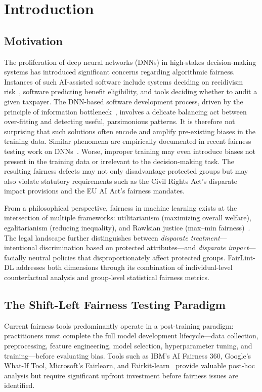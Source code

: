 \chapter{Introduction}
\label{ch:introduction}

\section{Motivation}

The proliferation of deep neural networks (DNNs) in high-stakes decision-making systems has introduced significant concerns regarding algorithmic fairness. Instances of such AI-assisted software include systems deciding on recidivism risk~\cite{dice}, software predicting benefit eligibility, and tools deciding whether to audit a given taxpayer. The DNN-based software development process, driven by the principle of information bottleneck~\cite{dice}, involves a delicate balancing act between over-fitting and detecting useful, parsimonious patterns. It is therefore not surprising that such solutions often encode and amplify pre-existing biases in the training data. Similar phenomena are empirically documented in recent fairness testing work on DNNs~\cite{dice}. Worse, improper training may even introduce biases not present in the training data or irrelevant to the decision-making task. The resulting fairness defects may not only disadvantage protected groups but may also violate statutory requirements such as the Civil Rights Act's disparate impact provisions and the EU AI Act's fairness mandates.

From a philosophical perspective, fairness in machine learning exists at the intersection of multiple frameworks: utilitarianism (maximizing overall welfare), egalitarianism (reducing inequality), and Rawlsian justice (max--min fairness)~\cite{Rawls1973JohnRA, barocas-hardt-narayanan}. The legal landscape further distinguishes between \emph{disparate treatment}---intentional discrimination based on protected attributes---and \emph{disparate impact}---facially neutral policies that disproportionately affect protected groups. FairLint-DL addresses both dimensions through its combination of individual-level counterfactual analysis and group-level statistical fairness metrics.

\section{The Shift-Left Fairness Testing Paradigm}

Current fairness tools predominantly operate in a post-training paradigm: practitioners must complete the full model development lifecycle---data collection, preprocessing, feature engineering, model selection, hyperparameter tuning, and training---before evaluating bias. Tools such as IBM's AI Fairness 360, Google's What-If Tool, Microsoft's Fairlearn, and Fairkit-learn~\cite{evt, fairlearn, Wexler_2019, bellamy2019, fairkitLearn} provide valuable post-hoc analysis but require significant upfront investment before fairness issues are identified.

